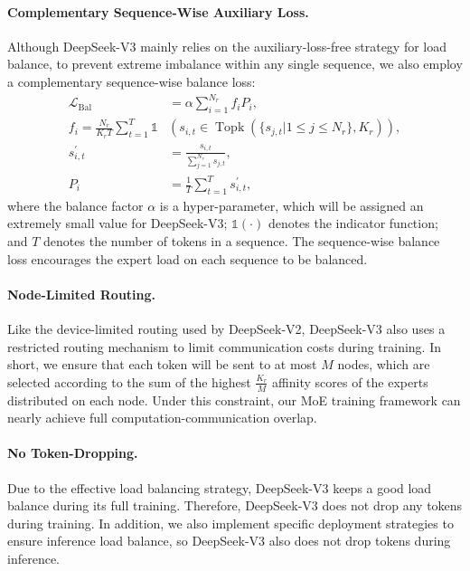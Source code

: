 \documentclass[11pt, a4paper, logo, copyright, nonumbering]{deepseek}
\newcommand{\dsvii}{DeepSeek-V2}
\newcommand{\dsviii}{DeepSeek-V3}
\begin{document}
\begin{CJK*}{UTF8}{gbsn}
\paragraph{Complementary Sequence-Wise Auxiliary Loss.}
Although \dsviii{} mainly relies on the auxiliary-loss-free strategy for load balance, to prevent extreme imbalance within any single sequence, we also employ a complementary sequence-wise balance loss:
\begin{align}
    \mathcal{L}_{\mathrm{Bal}} & = \alpha \sum_{i=1}^{N_r}{f_i P_i}, \\
    f_i = \frac{N_r}{K_r T} \sum_{t=1}^{T} \mathds{1} & \left( s_{i,t} \in \operatorname{Topk} ( \{ s_{j, t} | 1 \leq j \leq N_r \}, K_{r} ) \right), \\
    s^{\prime}_{i,t} & = \frac{s_{i,t}}{\sum_{j=1}^{N_r} s_{j,t}}, \\
    P_i & = \frac{1}{T} \sum_{t=1}^{T}{s^{\prime}_{i,t}},
\end{align}
where the balance factor $\alpha$ is a hyper-parameter, which will be assigned an extremely small value for \dsviii{}; 
$\mathds{1}(\cdot)$ denotes the indicator function; 
and $T$ denotes the number of tokens in a sequence. 
The sequence-wise balance loss encourages the expert load on each sequence to be balanced. 

\paragraph{Node-Limited Routing.}
Like the device-limited routing used by \dsvii{}, \dsviii{} also uses a restricted routing mechanism to limit communication costs during training. 
In short, we ensure that each token will be sent to at most $M$ nodes, which are selected according to the sum of the highest $\frac{K_r}{M}$ affinity scores of the experts distributed on each node.
Under this constraint, our MoE training framework can nearly achieve full computation-communication overlap. 

\paragraph{No Token-Dropping.}
Due to the effective load balancing strategy, \dsviii{} keeps a good load balance during its full training. 
Therefore, \dsviii{} does not drop any tokens during training. 
In addition, we also implement specific deployment strategies to ensure inference load balance, so \dsviii{} also does not drop tokens during inference. 


\end{CJK*}
\end{document}
